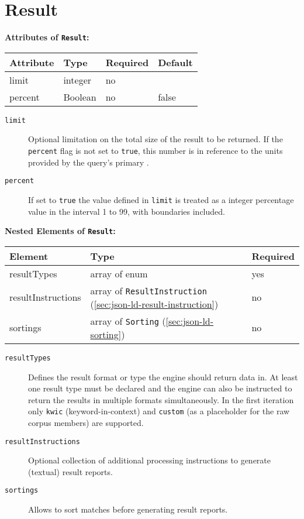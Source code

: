 \documentclass[11pt,a4paper]{report}
\newcommand{\iqlType}[1]{\texttt{\iqlns#1}}
\newenvironment{attributes}[1]{
	\noindent\textbf{Attributes of #1:}\newline\medskip
	\begin{tabular}{|p{0.3\textwidth}|p{0.20\textwidth}|p{0.20\textwidth}|p{0.17\textwidth}|}
		\hline
		\textbf{Attribute} & \textbf{Type} & \textbf{Required} & \textbf{Default} \\ 
		\hline
		\hline
	}{
	\end{tabular}
}
\newcommand{\attribute}[4]{
	#1 & #2 & #3 & #4 \\
	\hline
}
\newenvironment{elements}[1]{
	\noindent\textbf{Nested Elements of #1:}\newline\medskip
	\begin{tabular}{|p{0.3\textwidth}|p{0.42\textwidth}|p{0.17\textwidth}|}
		\hline
		\textbf{Element} & \textbf{Type} & \textbf{Required} \\ 
		\hline
		\hline
	}{
	\end{tabular}
}
\newcommand{\element}[3]{
	#1 & #2 & #3 \\
	\hline
}
\begin{document}
\section{Result}
\label{sec:json-ld-result}
\begin{attributes}{\iqlType{Result}}
	\attribute{limit}{integer}{no}{}
	\attribute{percent}{Boolean}{no}{false}
\end{attributes}
\begin{description}
	\item[\iqlType{limit}] Optional limitation on the total size of the result to be returned. If the \iqlType{percent} flag is not set to \texttt{true}, this number is in reference to the units provided by the query's primary .
	\item[\iqlType{percent}] If set to \texttt{true} the value defined in \iqlType{limit} is treated as a integer percentage value in the interval 1 to 99, with boundaries included.
\end{description}
\begin{elements}{\iqlType{Result}}
	\element{resultTypes}{array of enum}{yes}
	\element{resultInstructions}{array of \iqlType{ResultInstruction} (\ref{sec:json-ld-result-instruction})}{no}
	\element{sortings}{array of \iqlType{Sorting} (\ref{sec:json-ld-sorting})}{no}
\end{elements}
\begin{description}
	\item[\iqlType{resultTypes}] Defines the result format or type the engine should return data in. At least one result type must be declared and the engine can also be instructed to return the results in multiple formats simultaneously. In the first iteration only \texttt{kwic} (keyword-in-context) and \texttt{custom} (as a placeholder for the raw corpus members) are supported.
	\item[\iqlType{resultInstructions}] Optional collection of additional processing instructions to generate (textual) result reports.
	\item[\iqlType{sortings}] Allows to sort matches before generating result reports.
\end{description}
\end{document}
